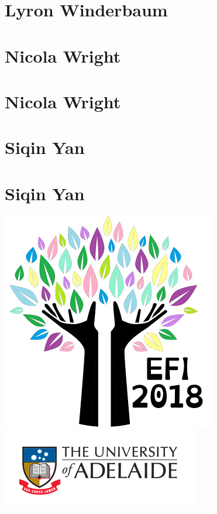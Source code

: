 \documentclass[twoside,14pt,a4paper,notitlepage]{memoir}
\begin{document}
\lipsum[1-2]
\section*{Lyron Winderbaum}
\lipsum[3]



\section*{Nicola Wright}
\label{aut:wright}

\lipsum[1-2]
\section*{Nicola Wright}
\lipsum[3]



\section*{Siqin Yan}
\label{aut:yan}

\lipsum[1-2]
\section*{Siqin Yan}
\lipsum[3]



\vfill
\includegraphics[scale=0.5]{colour_tree.png}
\hfill
\includegraphics[scale=1]{uoa-logo-col-horiz.png}
\end{document}
